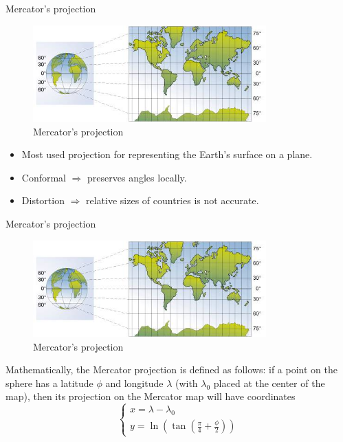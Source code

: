 \documentclass[10pt]{beamer}
\begin{document}
\begin{frame}{Mercator's projection}
  \begin{figure}[H]
    \centering
    \includegraphics[width=0.8\textwidth]{images/mercator.jpg}
    \caption{Mercator's projection}
\end{figure}

\begin{itemize}
  \item Most used projection for representing the Earth's surface on a plane.
  \item Conformal $\Longrightarrow$ preserves angles locally.
  \item Distortion $\Longrightarrow$ relative sizes of countries is not accurate.
\end{itemize}
\end{frame}

\begin{frame}{Mercator's projection}
  \begin{figure}[H]
    \centering
    \includegraphics[width=0.8\textwidth]{images/mercator.jpg}
    \caption{Mercator's projection}
\end{figure}
Mathematically, the Mercator projection is defined as follows: if a point on 
the sphere has a latitude $\phi$ and longitude $\lambda$ (with $\lambda_{0}$ 
placed at the center of the map), then its projection on the Mercator map will 
have coordinates 
\begin{equation}
  \left\{
  \begin{array}{l}
      x =  \lambda - \lambda_{0} \\
      y =  \ln(\tan(\frac{\pi}{4} + \frac{\phi}{2}))
  \end{array}
  \right.
\end{equation}
\end{frame}
\end{document}
